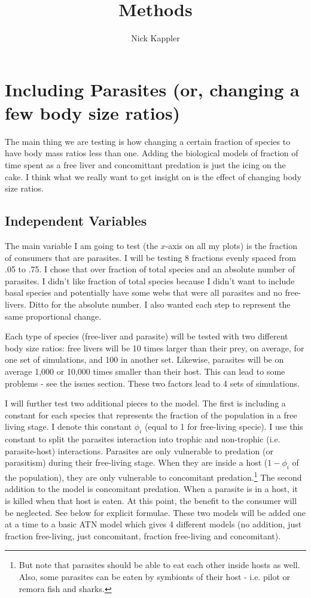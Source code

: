 \documentclass[11pt]{amsart}
\title{Methods}
\author{Nick Kappler}
\begin{document}
\maketitle
\section{Including Parasites (or, changing a few body size ratios)}
The main thing we are testing is how changing a certain fraction of species to have body mass ratios less than one.  Adding the biological models of fraction of time spent as a free liver and concomittant predation is just the icing on the cake.  I think what we really want to get insight on is the effect of changing body size ratios.

\subsection{Independent Variables}
The main variable I am going to test (the $x$-axis on all my plots) is the fraction of consumers that are parasites.  I will be testing 8 fractions evenly spaced from .05 to .75.  I chose that over fraction of total species and an absolute number of parasites.  I didn't like fraction of total species because I didn't want to include basal species and potentially have some webs that were all parasites and no free-livers.  Ditto for the absolute number.  I also wanted each step to represent the same proportional change.

Each type of species (free-liver and parasite) will be tested with two different body size ratios: free livers will be 10 times larger than their prey, on average, for one set of simulations, and 100 in another set.  Likewise, parasites will be on average 1,000 or 10,000 times smaller than their host.  This can lead to some problems - see the issues section.  These two factors lead to 4 sets of simulations.

I will further test two additional pieces to the model.  The first is including a constant for each species that represents the fraction of the population in a free living stage.  I denote this constant $\phi_{i}$ (equal to 1 for free-living specie).  I use this constant to split the parasites interaction into trophic and non-trophic (i.e. parasite-host) interactions.  Parasites are only vulnerable to predation (or parasitism) during their free-living stage.  When they are inside a host ($1-\phi_{i}$ of the population), they are only vulnerable to concomitant predation.\footnote{But note that parasites should be able to eat each other inside hosts as well.  Also, some parasites can be eaten by symbionts of their host - i.e. pilot or remora fish and sharks.}  The second addition to the model is concomitant predation.  When a parasite is in a host, it is killed when that host is eaten.  At this point, the benefit to the consumer will be neglected.  See below for explicit formulae.  These two models will be added one at a time to a basic ATN model which gives 4 different models (no addition, just fraction free-living, just concomitant, fraction free-living and concomitant).
\end{document}
